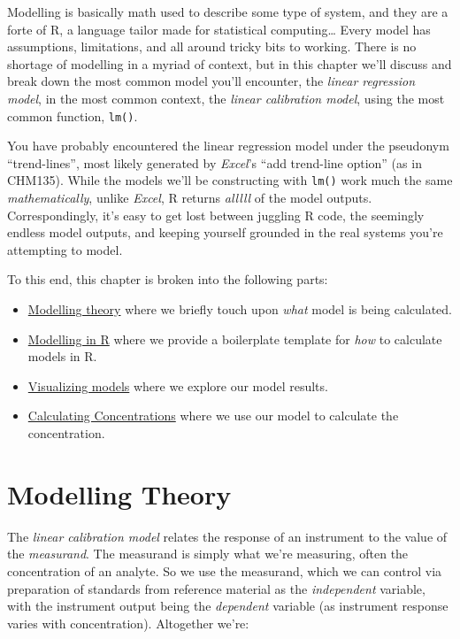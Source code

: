 \documentclass[
]{book}
\providecommand{\tightlist}{%
  \setlength{\itemsep}{0pt}\setlength{\parskip}{0pt}}
\begin{document}
Modelling is basically math used to describe some type of system, and they are a forte of R, a language tailor made for statistical computing\ldots{} Every model has assumptions, limitations, and all around tricky bits to working. There is no shortage of modelling in a myriad of context, but in this chapter we'll discuss and break down the most common model you'll encounter, the \emph{linear regression model}, in the most common context, the \emph{linear calibration model}, using the most common function, \texttt{lm()}.

You have probably encountered the linear regression model under the pseudonym ``trend-lines'', most likely generated by \emph{Excel}'s ``add trend-line option'' (as in CHM135). While the models we'll be constructing with \texttt{lm()} work much the same \emph{mathematically}, unlike \emph{Excel}, R returns \emph{alllll} of the model outputs. Correspondingly, it's easy to get lost between juggling R code, the seemingly endless model outputs, and keeping yourself grounded in the real systems you're attempting to model.

To this end, this chapter is broken into the following parts:

\begin{itemize}
\tightlist
\item
  \protect\hyperlink{modelling-theory}{Modelling theory} where we briefly touch upon \emph{what} model is being calculated.
\item
  \protect\hyperlink{modelling-in-r}{Modelling in R} where we provide a boilerplate template for \emph{how} to calculate models in R.
\item
  \protect\hyperlink{visualizing-models}{Visualizing models} where we explore our model results.
\item
  \protect\hyperlink{calculating-concentrations}{Calculating Concentrations} where we use our model to calculate the concentration.
\end{itemize}

\hypertarget{modelling-theory}{%
\section{Modelling Theory}\label{modelling-theory}}

The \emph{linear calibration model} relates the response of an instrument to the value of the \emph{measurand}. The measurand is simply what we're measuring, often the concentration of an analyte. So we use the measurand, which we can control via preparation of standards from reference material as the \emph{independent} variable, with the instrument output being the \emph{dependent} variable (as instrument response varies with concentration). Altogether we're:
\end{document}
